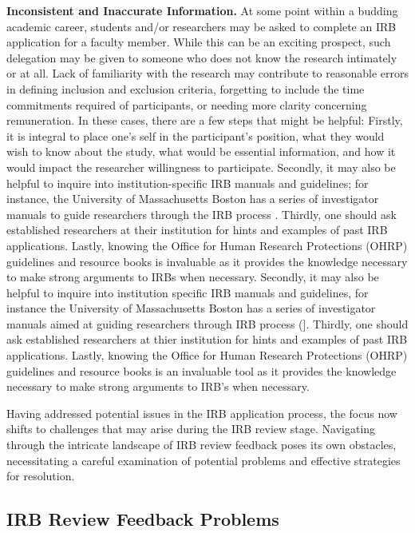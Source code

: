 \documentclass[
  11pt,
]{book}
\begin{document}
\textbf{Inconsistent and Inaccurate Information.} At some point within a budding academic career, students and/or researchers may be asked to complete an IRB application for a faculty member. While this can be an exciting prospect, such delegation may be given to someone who does not know the research intimately or at all. Lack of familiarity with the research may contribute to reasonable errors in defining inclusion and exclusion criteria, forgetting to include the time commitments required of participants, or needing more clarity concerning remuneration. In these cases, there are a few steps that might be helpful: Firstly, it is integral to place one's self in the participant's position, what they would wish to know about the study, what would be essential information, and how it would impact the researcher willingness to participate. Secondly, it may also be helpful to inquire into institution-specific IRB manuals and guidelines; for instance, the University of Massachusetts Boston has a series of investigator manuals to guide researchers through the IRB process \citep{u_mass_boston_hrp-103_2022}. Thirdly, one should ask established researchers at their institution for hints and examples of past IRB applications. Lastly, knowing the Office for Human Research Protections (OHRP) guidelines and resource books is invaluable as it provides the knowledge necessary to make strong arguments to IRBs when necessary. Secondly, it may also be helpful to inquire into institution specific IRB manuals and guidelines, for instance the University of Massachusetts Boston has a series of investigator manuals aimed at guiding researchers through IRB process (\citet{u_mass_boston_hrp-103_2022}{]}. Thirdly, one should ask established researchers at thier institution for hints and examples of past IRB applications. Lastly, knowing the Office for Human Research Protections (OHRP) guidelines and resource books is an invaluable tool as it provides the knowledge necessary to make strong arguments to IRB's when necessary.

Having addressed potential issues in the IRB application process, the focus now shifts to challenges that may arise during the IRB review stage. Navigating through the intricate landscape of IRB review feedback poses its own obstacles, necessitating a careful examination of potential problems and effective strategies for resolution.

\subsection{IRB Review Feedback Problems}\label{irb-review-feedback-problems}
\end{document}
